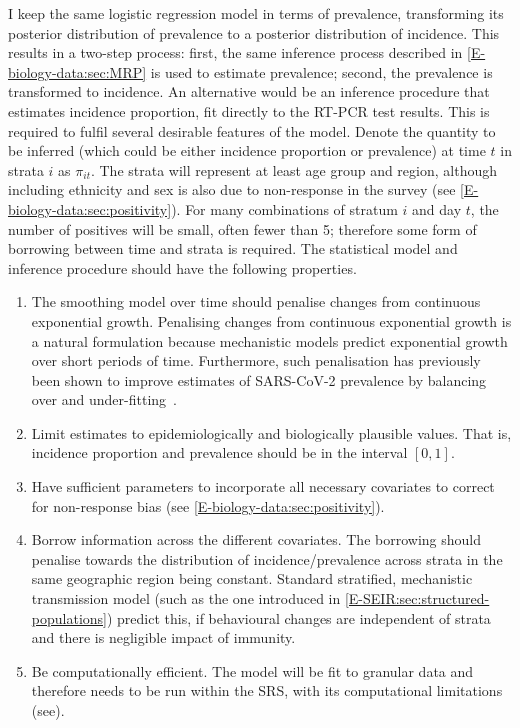 \documentclass[thesis.tex]{subfiles}
\begin{document}
I keep the same logistic regression model in terms of prevalence, transforming its posterior distribution of prevalence to a posterior distribution of incidence.
This results in a two-step process: first, the same inference process described in \cref{E-biology-data:sec:MRP} is used to estimate prevalence; second, the prevalence is transformed to incidence.
An alternative would be an inference procedure that estimates incidence proportion, fit directly to the RT-PCR test results.
This is required to fulfil several desirable features of the model.
Denote the quantity to be inferred (which could be either incidence proportion or prevalence) at time $t$ in strata $i$ as $\pi_{it}$.
The strata will represent at least age group and region, although including ethnicity and sex is also due to non-response in the survey (see \cref{E-biology-data:sec:positivity}).
For many combinations of stratum $i$ and day $t$, the number of positives will be small, often fewer than 5; therefore some form of borrowing between time and strata is required.
The statistical model and inference procedure should have the following properties.
\begin{enumerate}
    \item The smoothing model over time should penalise changes from continuous exponential growth.
        Penalising changes from continuous exponential growth is a natural formulation because mechanistic models predict exponential growth over short periods of time.
        Furthermore, such penalisation has previously been shown to improve estimates of SARS-CoV-2 prevalence by balancing over and under-fitting~\autocite{ealesAppropriately}.
    \item Limit estimates to epidemiologically and biologically plausible values.
        That is, incidence proportion and prevalence should be in the interval $[0, 1]$.
    \item Have sufficient parameters to incorporate all necessary covariates to correct for non-response bias (see \cref{E-biology-data:sec:positivity}).
    \item Borrow information across the different covariates.
        The borrowing should penalise towards the distribution of incidence/prevalence across strata in the same geographic region being constant.
        Standard stratified, mechanistic transmission model (such as the one introduced in \cref{E-SEIR:sec:structured-populations}) predict this, if behavioural changes are independent of strata and there is negligible impact of immunity.
    \item Be computationally efficient.
        The model will be fit to granular data and therefore needs to be run within the SRS, with its computational limitations (see).
\end{enumerate}
\end{document}

